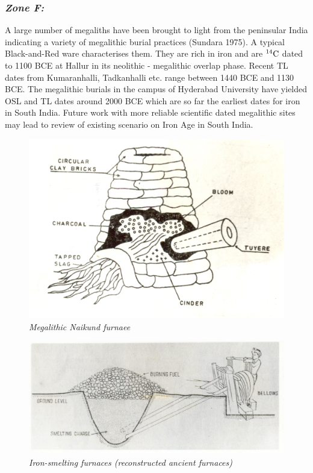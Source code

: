 \vspace{-.3cm}

\subsubsection*{\textit{Zone F:}}

\vspace{-.2cm}

A large number of megaliths have been brought to light from the peninsular India indicating a variety of megalithic burial practices (Sundara 1975). A typical Black-and-Red ware characterises them. They are rich in iron and are $^{14}{\rm C}$ dated to 1100 BCE at Hallur in its neolithic - megalithic overlap phase. Recent TL dates from Kumaranhalli, Tadkanhalli etc. range between 1440 BCE and 1130 BCE. The megalithic burials in the campus of Hyderabad University have yielded OSL and TL dates around 2000 BCE which are so far the earliest dates for iron in South India. Future work with more reliable  scientific  dated megalithic sites may lead to review of existing scenario on Iron Age in South India.

\begin{figure}[H]
\includegraphics[scale=.85]{images/chapter-3/fig002a.jpg}
\caption*{\textit{Megalithic Naikund furnaee}}\label{chapter3-fig002a}
\end{figure}
\begin{figure}[H]
\setcounter{figure}{3}
\includegraphics[scale=.85]{images/chapter-3/fig002b.jpg}
\caption{\textit{Iron-smelting furnaces (reconstructed ancient furnaces)}}\label{chapter3-fig002b}
\end{figure}

